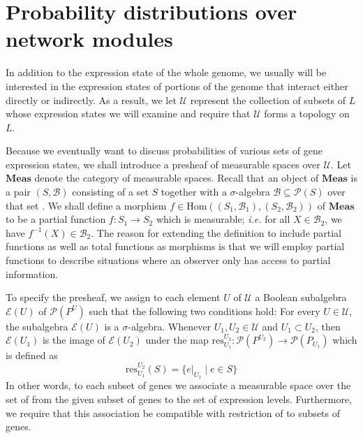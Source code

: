 \section{Probability distributions over network modules}

In addition to the expression state of the whole genome, we usually will be interested in the expression states of portions of the genome that interact either directly or indirectly.  As a result, we let $\mathcal{U}$ represent the collection of subsets of $L$ whose expression states we will examine and require that $\mathcal{U}$ forms a topology on $L$.

Because we eventually want to discuss probabilities of various sets of gene expression states, we shall introduce a presheaf of measurable spaces over $\mathcal{U}$.  Let $\mathbf{Meas}$ denote the category of measurable spaces. Recall that an object of $\mathbf{Meas}$ is a pair $(S,\mathcal{B})$ consisting of a set $S$ together with a $\sigma$-algebra $\mathcal{B} \subseteq \mathcal{P}(S)$ over that set \cite{Ash1999}.  We shall define a morphism $f \in \mathrm{Hom}((S_1,\mathcal{B}_1), (S_2,\mathcal{B}_2))$ of $\mathbf{Meas}$ to be a partial function $f \colon S_1 \to S_2$ which is measurable; \emph{i.e.} for all $X \in \mathcal{B}_2$, we have $f^{-1} (X) \in \mathcal{B}_2$.  The reason for extending the definition to include partial functions as well as total functions as morphisms is that we will employ partial functions to describe situations where an observer only has access to partial information.

To specify the presheaf, we assign to each element $U$ of $\mathcal{U}$ a Boolean subalgebra $\mathcal{E}(U)$ of $\mathcal{P}({P^U})$ such that the following two conditions hold:  For every $U \in \mathcal{U}$, the subalgebra $\mathcal{E}(U)$ is a $\sigma$-algebra.  Whenever $U_1, U_2 \in \mathcal{U}$ and $U_1 \subset U_2$, then $\mathcal{E}(U_1)$ is the image of $\mathcal{E}(U_2)$ under the map $\mathrm{res}^{U_2}_{U_1} \colon \mathcal{P}(P^{U_2}) \to \mathcal{P}(P_{U_1})$ which is defined as
\[
 \mathrm{res}^{U_2}_{U_1} (S) =
 \{ e|_{U_1} \mid e \in S\}
\]
In other words, to each subset of genes we associate a measurable space over the set of \gnpm{} from the given subset of genes to the set of expression levels.  Furthermore, we require that this association be compatible with restriction of \gnpm{} to subsets of genes.

